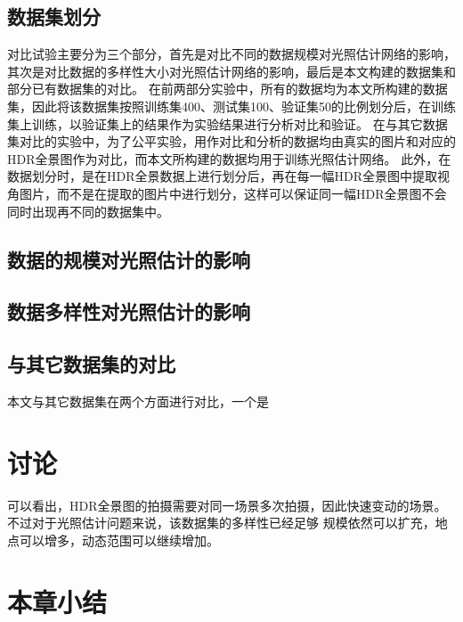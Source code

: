 \subsection{数据集划分}
对比试验主要分为三个部分，首先是对比不同的数据规模对光照估计网络的影响，其次是对比数据的多样性大小对光照估计网络的影响，最后是本文构建的数据集和部分已有数据集的对比。
在前两部分实验中，所有的数据均为本文所构建的数据集，因此将该数据集按照训练集400、测试集100、验证集50的比例划分后，在训练集上训练，以验证集上的结果作为实验结果进行分析对比和验证。
在与其它数据集对比的实验中，为了公平实验，用作对比和分析的数据均由真实的图片和对应的HDR全景图作为对比，而本文所构建的数据均用于训练光照估计网络。
此外，在数据划分时，是在HDR全景数据上进行划分后，再在每一幅HDR全景图中提取视角图片，而不是在提取的图片中进行划分，这样可以保证同一幅HDR全景图不会同时出现再不同的数据集中。
\subsection{数据的规模对光照估计的影响}
\subsection{数据多样性对光照估计的影响}
\subsection{与其它数据集的对比}
本文与其它数据集在两个方面进行对比，一个是
\section{讨论}
可以看出，HDR全景图的拍摄需要对同一场景多次拍摄，因此快速变动的场景。不过对于光照估计问题来说，该数据集的多样性已经足够
规模依然可以扩充，地点可以增多，动态范围可以继续增加。
\section{本章小结}